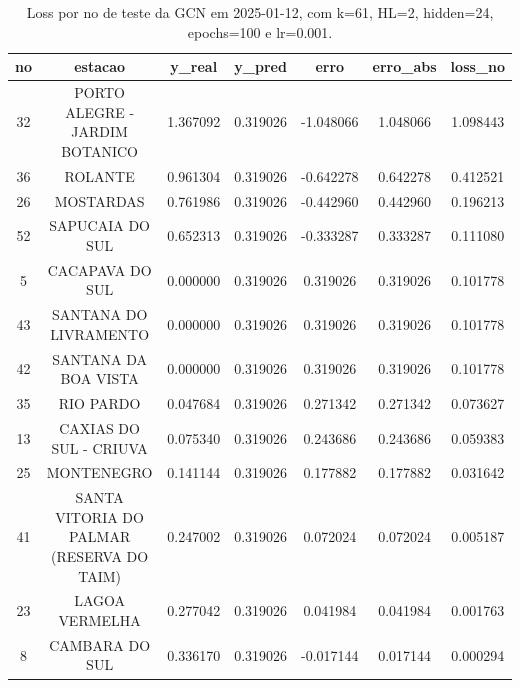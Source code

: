 \begin{table}[h]
\centering
\caption{Loss por no de teste da GCN em 2025-01-12, com k=61, HL=2, hidden=24, epochs=100 e lr=0.001.}
\label{tab:gcn_loss_k61_hl2_h24_e100_d20250112}
\begin{tabular}{ccccccc}
\toprule
no & estacao & y\_real & y\_pred & erro & erro\_abs & loss\_no \\
\midrule
32 & PORTO ALEGRE - JARDIM BOTANICO & 1.367092 & 0.319026 & -1.048066 & 1.048066 & 1.098443 \\
36 & ROLANTE & 0.961304 & 0.319026 & -0.642278 & 0.642278 & 0.412521 \\
26 & MOSTARDAS & 0.761986 & 0.319026 & -0.442960 & 0.442960 & 0.196213 \\
52 & SAPUCAIA DO SUL & 0.652313 & 0.319026 & -0.333287 & 0.333287 & 0.111080 \\
5 & CACAPAVA DO SUL & 0.000000 & 0.319026 & 0.319026 & 0.319026 & 0.101778 \\
43 & SANTANA DO LIVRAMENTO & 0.000000 & 0.319026 & 0.319026 & 0.319026 & 0.101778 \\
42 & SANTANA DA BOA VISTA & 0.000000 & 0.319026 & 0.319026 & 0.319026 & 0.101778 \\
35 & RIO PARDO & 0.047684 & 0.319026 & 0.271342 & 0.271342 & 0.073627 \\
13 & CAXIAS DO SUL - CRIUVA & 0.075340 & 0.319026 & 0.243686 & 0.243686 & 0.059383 \\
25 & MONTENEGRO & 0.141144 & 0.319026 & 0.177882 & 0.177882 & 0.031642 \\
41 & SANTA VITORIA DO PALMAR (RESERVA DO TAIM) & 0.247002 & 0.319026 & 0.072024 & 0.072024 & 0.005187 \\
23 & LAGOA VERMELHA & 0.277042 & 0.319026 & 0.041984 & 0.041984 & 0.001763 \\
8 & CAMBARA DO SUL & 0.336170 & 0.319026 & -0.017144 & 0.017144 & 0.000294 \\
\bottomrule
\end{tabular}
\end{table}
